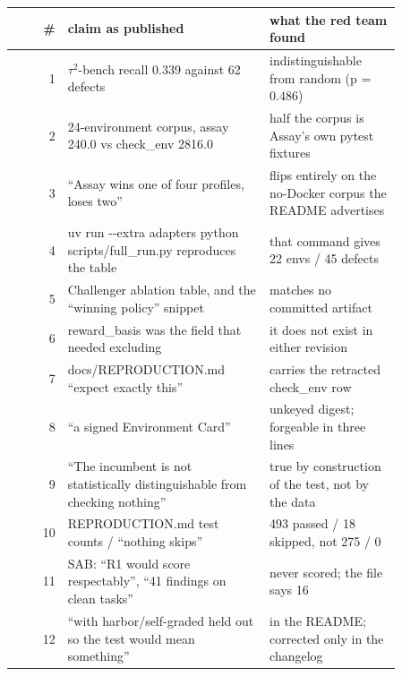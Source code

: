 \begin{tabular}{@{}rp{0.52\linewidth}p{0.34\linewidth}@{}}
\toprule
\# & claim as published & what the red team found \\
\midrule
1 & $\tau^2$-bench recall 0.339 against 62 defects & indistinguishable from random (p = 0.486) \\
2 & 24-environment corpus, assay 240.0 vs check\_env 2816.0 & half the corpus is Assay's own pytest fixtures \\
3 & ``Assay wins one of four profiles, loses two'' & flips entirely on the no-Docker corpus the README advertises \\
4 & uv run -{}-extra adapters python scripts/full\_run.py reproduces the table & that command gives 22 envs / 45 defects \\
5 & Challenger ablation table, and the ``winning policy'' snippet & matches no committed artifact \\
6 & reward\_basis was the field that needed excluding & it does not exist in either revision \\
7 & docs/REPRODUCTION.md ``expect exactly this'' & carries the retracted check\_env row \\
8 & ``a signed Environment Card'' & unkeyed digest; forgeable in three lines \\
9 & ``The incumbent is not statistically distinguishable from checking nothing'' & true by construction of the test, not by the data \\
10 & REPRODUCTION.md test counts / ``nothing skips'' & 493 passed / 18 skipped, not 275 / 0 \\
11 & SAB: ``R1 would score respectably'', ``41 findings on clean tasks'' & never scored; the file says 16 \\
12 & ``with harbor/self-graded held out so the test would mean something'' & in the README; corrected only in the changelog \\
\bottomrule
\end{tabular}
